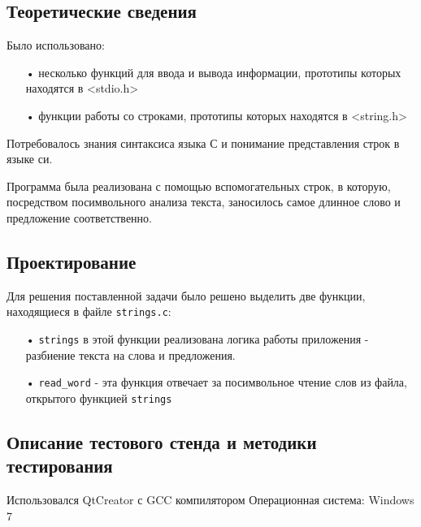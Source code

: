\documentclass[12pt,a4paper]{report}
\begin{document}
\subsection{Теоретические сведения}

Было использовано:
\begin{enumerate}
\item[•] несколько функций для ввода и вывода информации, прототипы которых находятся в <stdio.h>
\item[•] функции работы со строками, прототипы которых находятся в <string.h>
\end{enumerate}

Потребовалось знания синтаксиса языка С и понимание представления строк в языке си.

Программа была реализована с помощью вспомогательных строк, в которую, посредством посимвольного анализа текста, заносилось самое длинное слово и предложение соответственно.

\subsection{Проектирование}

Для решения поставленной задачи было решено выделить две функции, находящиеся в файле \verb-strings.c-:


\begin{enumerate}
\item[•] \verb-strings- в этой функции реализована логика работы приложения - разбиение текста на слова и предложения.
\item[•] \verb-read_word- - эта функция отвечает за посимвольное чтение слов из файла, открытого функцией \verb-strings-
\end{enumerate}

\subsection{Описание тестового стенда и методики тестирования}
Использовался QtCreator с GCC компилятором
Операционная система: Windows 7
\end{document}
